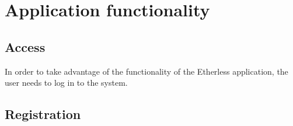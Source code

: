 \section{Application functionality}
\subsection{Access}
In order to take advantage of the functionality of the Etherless application, the user needs to log in to the system.

\subsection{Registration}